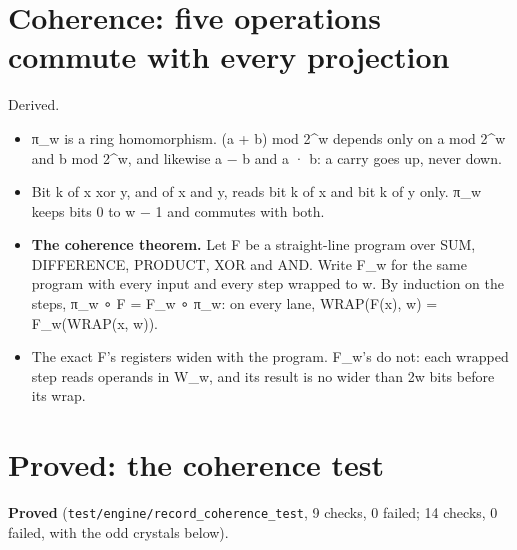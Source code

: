 \section{\texorpdfstring{Coherence: five operations commute with every projection}{Coherence: five operations commute with every projection}}

Derived.

\begin{itemize}
\item π\_\allowbreak{}w is a ring homomorphism. (a + b) mod 2\textasciicircum{}w depends only on a mod 2\textasciicircum{}w and b mod 2\textasciicircum{}w, and likewise a − b and a · b: a carry goes up, never down.
\item Bit k of x xor y, and of x and y, reads bit k of x and bit k of y only. π\_\allowbreak{}w keeps bits 0 to w − 1 and commutes with both.
\item \textbf{The coherence theorem.} Let F be a straight-line program over SUM, DIFFERENCE, PRODUCT, XOR and AND. Write F\_\allowbreak{}w for the same program with every input and every step wrapped to w. By induction on the steps, π\_\allowbreak{}w ∘ F = F\_\allowbreak{}w ∘ π\_\allowbreak{}w: on every lane, WRAP(F(x), w) = F\_\allowbreak{}w(WRAP(x, w)).
\item The exact F's registers widen with the program. F\_\allowbreak{}w's do not: each wrapped step reads operands in W\_\allowbreak{}w, and its result is no wider than 2w bits before its wrap.
\end{itemize}

\section{\texorpdfstring{Proved: the coherence test}{Proved: the coherence test}}

\textbf{Proved} (\texttt{test/\allowbreak{}engine/\allowbreak{}record\_\allowbreak{}coherence\_\allowbreak{}test}, 9 checks, 0 failed; 14 checks, 0 failed, with the odd crystals below).

